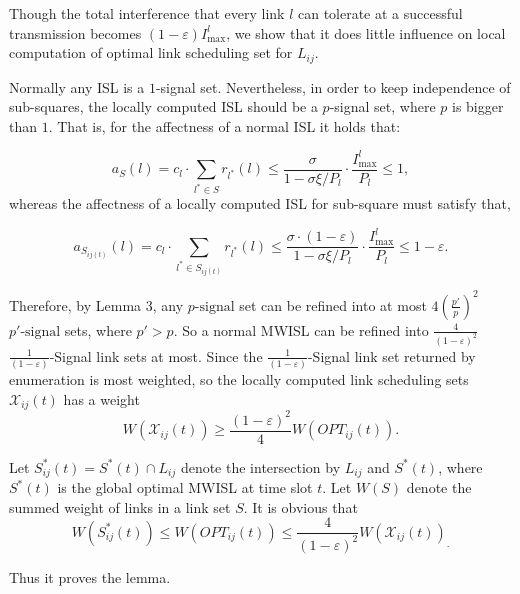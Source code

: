 \documentclass[journal]{IEEEtran}
\begin{document}
\begin{IEEEproof}
Though the total interference that every link $l$ can tolerate at a
successful transmission becomes $(1-\varepsilon )I_{\max }^l $, we show that
it does little influence on local computation of optimal link scheduling set
for $L_{ij}$.

Normally any ISL is a $1$-signal set. Nevertheless, in order to keep independence of
sub-squares, the locally computed ISL should be a $p$-signal set, where $p$ is
bigger than $1$. That is, for the affectness of a normal ISL it holds that:

 \begin{equation}
 a_S (l ) = c_l \cdot \sum\limits_{l^* \in S} {r_{l^*} (l )}
 \le \frac{\sigma }{1-\sigma \xi /P_{l } }\cdot \frac{I^{l }_{\max }
}{P_{l } } \le 1,
 \end{equation}
whereas the affectness of a locally computed ISL for sub-square must satisfy that,

 \begin{equation}
a_{S_{ij(t)} } (l ) = c_l \cdot \sum\limits_{l^* \in S_{ij(t)} } {r_{l^*} (l )}
    \le \frac{\sigma \cdot (1-\varepsilon )}{1-\sigma \xi /P_{l } }\cdot \frac{I_{\max }^{ l } }{P_{l } }
 \le 1-\varepsilon .
 \end{equation}


Therefore, by Lemma 3, any $p\mbox{-signal}$ set can be refined into at most
$4(\frac{p'}{p})^2$  $p'\mbox{-signal}$ sets, where $p'>p$. So a normal MWISL
can be refined into $\frac{4}{(1-\varepsilon )^2}$  $\frac{1}{(1-\varepsilon
)}$-Signal link sets at most. Since the $\frac{1}{(1-\varepsilon )}$-Signal
link set returned by enumeration is most weighted, so the locally computed link
scheduling sets $\mathcal{X}_{ij} (t)$ has a weight
\begin{equation}
W(\mathcal{X}_{ij} (t))\ge \frac{(1-\varepsilon)^2}{4}W(OPT_{ij} (t)).
\end{equation}

Let $S_{ij}^\ast (t)=S^\ast (t)\cap L_{ij} $ denote the intersection by
$L_{ij} $ and $S^\ast (t)$, where $S^\ast (t)$ is the global
optimal MWISL at time slot $t$. Let $W(S)$ denote the summed weight of links in
a link set $S$. It is obvious that
\begin{equation}
W(S_{ij}^\ast (t))\le W(OPT_{ij} (t))\le \frac{4}{(1-\varepsilon)^2}W(\mathcal{X}_{ij} (t))_{.}
\end{equation}

Thus it proves the lemma.
\end{IEEEproof}
\end{document}
